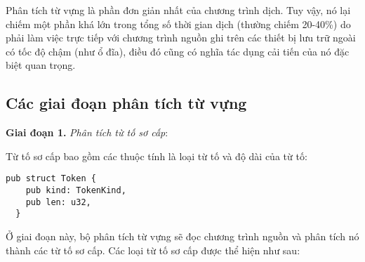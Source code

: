 Phân tích từ vựng là phần đơn giản nhất của chương trình dịch. Tuy vậy, nó lại chiếm một phần khá lớn trong tổng số thời gian dịch (thường chiếm 20-40\%) do phải làm việc trực tiếp với chương trình nguồn ghi trên các thiết bị lưu trữ ngoài có tốc độ chậm (như ổ đĩa), điều đó cũng có nghĩa tác dụng cải tiến của nó đặc biệt quan trọng.

\subsection{Các giai đoạn phân tích từ vựng}
\textbf{Giai đoạn 1.} \textit{Phân tích từ tố sơ cấp}:

Từ tố sơ cấp bao gồm các thuộc tính là loại từ tố và độ dài của từ tố:

\clearpage
\begin{lstlisting}[]
  pub struct Token {
    pub kind: TokenKind,
    pub len: u32,
  }
\end{lstlisting}

Ở giai đoạn này, bộ phân tích từ vựng sẽ đọc chương trình nguồn và phân tích nó thành các từ tố sơ cấp. Các loại từ tố sơ cấp được thể hiện như sau:

